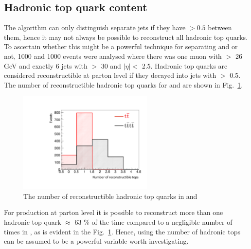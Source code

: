 \subsection{Hadronic top quark content}
\label{sec:topContent}

The \antikt algorithm can only distinguish separate jets if they have \DR$>0.5$ between them, hence it may not always be possible to reconstruct all hadronic top quarks. To ascertain whether this might be a powerful technique for separating \tttt and \ttbar or not, 1000 \tttt and 1000 \ttbar events were analysed where there was one muon with \PT $>$ 26 GeV and exactly 6 jets with \PT $>$ 30 and $\lvert \eta \rvert<$ 2.5. Hadronic top quarks are considered reconstructible at parton level if they decayed into jets with \DR  $>$  0.5. The number of reconstructible hadronic top quarks for \tttt and \ttbar are shown in Fig.~\ref{fig:ReconHadTops}.

\begin{figure}[!ht]
\centering

    \includegraphics[width=0.6\textwidth]{images/Run1/HadRecoTops.pdf}
    \caption{The number of reconstructible hadronic top quarks in \tttt and \ttbar}
    \label{fig:ReconHadTops}
\end{figure}

For \tttt production at parton level it is possible to reconstruct more than one hadronic top quark $\approx$ 63 $\%$ of the time compared to a negligible number of times in \ttbar, as is evident in the Fig.~\ref{fig:ReconHadTops}. Hence, using the number of hadronic tops can be assumed to be a powerful variable worth investigating. 

